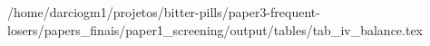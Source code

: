 /home/darciogm1/projetos/bitter-pills/paper3-frequent-losers/papers_finais/paper1_screening/output/tables/tab_iv_balance.tex